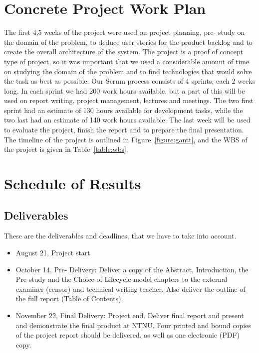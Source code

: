 \section{Concrete Project Work Plan}
The first 4,5 weeks of the project were used on project planning, pre- study on the domain of the problem, to deduce user stories for the product backlog and to create the overall architecture of the system. The project is a proof of concept type of project, so it was important that we used a considerable amount of time on studying the domain of the problem and to find technologies that would solve the task as best as possible. Our Scrum process consists of 4 sprints, each 2 weeks long. In each sprint we had 200 work hours available, but a part of this will be used on report writing, project management, lectures and meetings. The two first sprint had an estimate of 130 hours available for development tasks, while the two last had an estimate of 140 work hours available. The last week will be used to evaluate the project, finish the report and to prepare the final presentation. The timeline of the project is outlined in Figure~\ref{figure:gantt}, and the WBS of the project is given in Table~\ref{table:wbs}.

\section{Schedule of Results}
\subsection {Deliverables}
These are the deliverables and deadlines, that we have to take into account.
\begin {itemize}

\item August 21, Project start

\item October 14, Pre- Delivery: Deliver a copy of the Abstract, Introduction, the Pre-study and the Choice-of Lifecycle-model chapters to the external examiner (censor) and technical writing teacher. Also deliver the outline of the full report (Table of  Contents).

\item November 22, Final Delivery: Project end. Deliver final report and present and demonstrate the final product at NTNU. Four printed and bound copies of  the project report should be delivered, as well as one electronic (PDF) copy.

\end {itemize}

